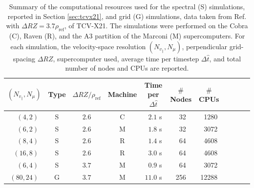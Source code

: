 \documentclass[preprint,12pt]{elsarticle}
\newcommand{\rhoref}{\rho_{\mathrm{ref}}}
\begin{document}


\begin{table}[t]
\centering
\begin{tabular}{cccccccccc||c}
$(N_{v_\parallel}, N_\mu)$ & Type & $\Delta RZ / \rhoref$ & Machine & Time per $\Delta \hat  t$ & $\#$ Nodes & $\#$ CPUs \\
\hline
\hline
$\phantom{00}(4,2)$ & S  &  $2.6$ & C &   $\phantom{0}2.1$ s  & $\phantom{0}$32 & $\phantom{0}$1280 \\
$\phantom{00}(6,2)$ &S & $2.6$  &M &  $\phantom{0}1.8$ s & $\phantom{0}$32 & $\phantom{0}$3072 \\
$\phantom{00}(8,4)$ &S & $2.6$  &R  &  $\phantom{0}1.4$ s & $\phantom{0}$64& $\phantom{0}$4608  \\
$\phantom{0}(16,8)$& S & $2.6$ &R  &  $\phantom{0}3.0$ s & $\phantom{0}$64& $\phantom{0}$4608  \\
$\phantom{00}(6,4)$ &S  & $3.7$ &M  &   $\phantom{0}0.9$ s & $\phantom{0}$64 & $\phantom{0}$3072  \\
$(80,24) $& G &  $3.7 $ &M  &   $11.0$ s  & 256 &  12288  \\
\end{tabular}
\caption{Summary of the computational resources used for the spectral (S) simulations, reported in Section \ref{sec:tcvx21}, and grid (G) simulations, data taken from Ref. \cite{ulbl2023phd} with $\Delta RZ = 3.7 \rhoref$, of TCV-X21. The simulations were performed on the Cobra (C), Raven (R), and the A3 partition of the Marconi (M) supercomputers. For each simulation, the velocity-space resolution $(N_{v_\parallel}, N_\mu)$, perpendicular grid-spacing $\Delta RZ$, supercomputer used, average time per timestep $ \Delta \hat t$, and total number of nodes and CPUs are reported.}
\label{table:summary}
\end{table}
\end{document}
